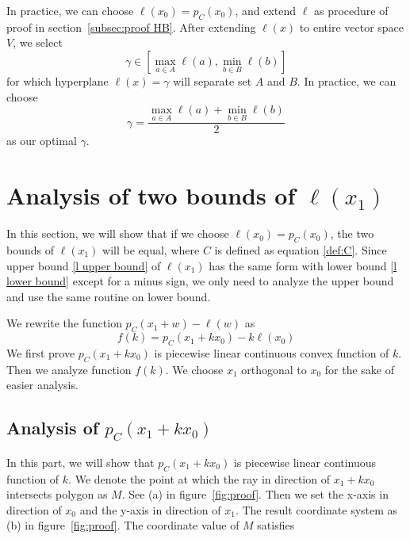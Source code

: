 \documentclass{article}
\begin{document}
In practice, we can choose $\ell(x_0)=p_C(x_0)$, and extend $\ell$ as procedure of proof in section~\ref{subsec:proof HB}. After extending $\ell(x)$ to entire 
vector space $V$, we select
\begin{equation*}
	\gamma\in \left[\max_{a\in A}{\ell(a)},\min_{b\in B}{\ell(b)}\right]
\end{equation*}
for which hyperplane $\ell(x)=\gamma$
will separate
set $A$ and $B$. In practice, we can choose
\begin{equation}\label{optimal gamma}
	 \gamma=\frac{\max_{a\in A}{\ell(a)}+\min_{b\in B}{\ell(b)}}{2}
\end{equation}
as our optimal $\gamma$.




\section{Analysis of two bounds of $\ell(x_1)$}
\label{sec:bounds analysis}
In this section, we will show that if we choose $\ell(x_0)=p_C(x_0)$, the two bounds of $\ell(x_1)$ will be equal, where $C$ is defined as equation \eqref{def:C}.
Since upper bound \eqref{l upper bound} of $\ell(x_1)$ has the same form with lower bound \eqref{l lower bound} except for a minus sign, we only need to analyze
the upper bound and use the same routine on lower bound.\par
We rewrite the function $p_C(x_1+w)-\ell(w)$ as
\begin{equation}\label{eq:f(k)}
	f(k)=p_C(x_1+kx_0)-k\ell(x_0)
\end{equation}
We first prove $p_C(x_1+kx_0)$ is piecewise linear continuous convex function of $k$.
Then we analyze function $f(k)$. We choose $x_1$ orthogonal to $x_0$ for the
sake of easier analysis. %

\subsection{Analysis of $p_C(x_1+kx_0)$}
In this part, we will show that $p_C(x_1+kx_0)$ is piecewise linear continuous function of $k$. We denote the point at which the ray in direction of  $x_1+kx_0$ 
intersects polygon as $M$. See (a) in figure~\ref{fig:proof}. Then we set the x-axis in direction of $x_0$ and the y-axis in direction
of $x_1$. The result coordinate system as (b) in figure~\ref{fig:proof}. The coordinate value of $M$ satisfies\par
\end{document}
